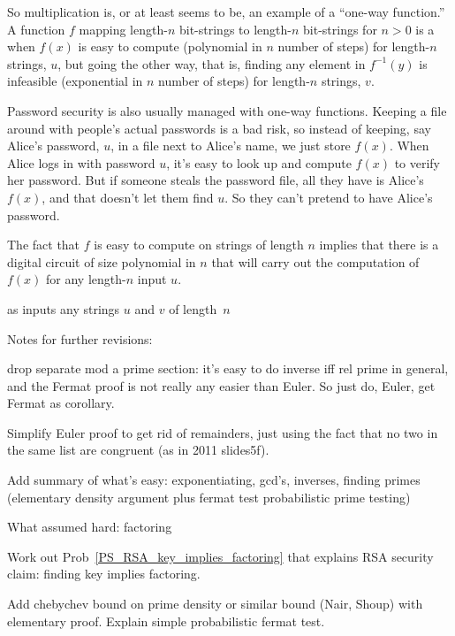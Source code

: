 So multiplication is, or
at least seems to be, an example of a ``one-way function.''  A
function $f$ mapping length-$n$ bit-strings to length-$n$ bit-strings
for $n > 0$ is a  when $f(x)$ is easy to
compute (polynomial in $n$ number of steps) for length-$n$ strings,
$u$, but going the other way, that is, finding any element in
$f^{-1}(y)$ is infeasible (exponential in $n$ number of steps) for
length-$n$ strings, $v$.

Password security is also usually managed with one-way functions.
Keeping a file around with people's actual passwords is a bad risk, so
instead of keeping, say Alice's password, $u$, in a file next to
Alice's name, we just store $f(x)$.  When Alice logs in with password
$u$, it's easy to look up and compute $f(x)$ to verify her password.
But if someone steals the password file, all they have is Alice's
$f(x)$, and that doesn't let them find $u$.  So they can't pretend to
have Alice's password.

The fact that $f$ is easy to compute on strings of length $n$ implies
that there is a digital circuit of size polynomial in $n$ that will
carry out the computation of $f(x)$ for any length-$n$ input $u$.

as inputs any strings $u$ and $v$ of length~$n$
\fi


\begin{problems}

\classproblems
{}
\end{problems}


\begin{editingnotes}
Notes for further revisions:

drop separate mod a prime section: it's easy to do inverse iff rel
prime in general, and the Fermat proof is not really any easier than
Euler. So just do, Euler, get Fermat as corollary.

Simplify Euler proof to get rid of remainders, just using the fact
that no two in the same list are congruent (as in 2011 slides5f).

Add summary of what's easy: exponentiating, gcd's, inverses, finding
primes (elementary density argument plus fermat test probabilistic
prime testing)

What assumed hard: factoring

Work out Prob~\ref{PS_RSA_key_implies_factoring} that explains RSA security
claim: finding key implies factoring.

Add chebychev bound on prime density or similar bound (Nair, Shoup) with
elementary proof.  Explain simple probabilistic fermat test.
\end{editingnotes}

\endinput
